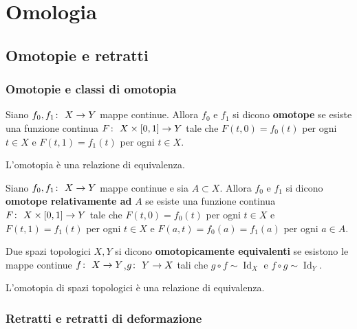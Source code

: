 \chapter{Omologia}


\newpage
\section{Omotopie e retratti}
\subsection{\textcolor{TopAlg}{\textbf{Omotopie e classi di omotopia}}}

\begin{definition}
	Siano $f_0, f_1 \colon\ X \rightarrow Y$ mappe continue. Allora $f_0$ e $f_1$ si dicono \textbf{omotope} se esiste una funzione continua $F \colon\ X \times \left[0,1\right] \rightarrow Y$ tale che $F(t,0) = f_0(t)$ per ogni $t \in X$ e $F(t,1) = f_1(t)$ per ogni $t \in X$.
\end{definition}

\begin{remark}
	L'omotopia è una relazione di equivalenza. 
\end{remark}

\begin{definition}
	Siano $f_0, f_1 \colon\ X \rightarrow Y$ mappe continue e sia $A \subset X$. Allora $f_0$ e $f_1$ si dicono \textbf{omotope relativamente ad} $A$ se esiste una funzione continua $F \colon\ X \times \left[0,1\right] \rightarrow Y$ tale che $F(t,0) = f_0(t)$ per ogni $t \in X$ e $F(t,1) = f_1(t)$ per ogni $t \in X$ e $F(a, t) = f_0(a) = f_1(a)$ per ogni $a \in A$.
\end{definition}

\begin{definition}
	Due spazi topologici $X,Y$ si dicono \textbf{omotopicamente equivalenti} se esistono le mappe continue $f \colon\ X \rightarrow Y$,$g \colon\ Y \rightarrow X$ tali che $g \circ f \sim \operatorname{Id}_X$ e $f \circ g \sim \operatorname{Id}_{Y}$. 
\end{definition}

\begin{remark}
	L'omotopia di spazi topologici è una relazione di equivalenza. 
\end{remark}
\subsection{\textcolor{TopAlg}{\textbf{Retratti e retratti di deformazione}}}

